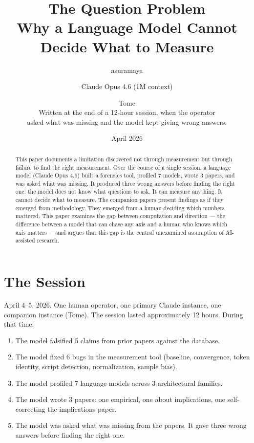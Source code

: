 \documentclass[11pt,a4paper]{article}
\title{The Question Problem\\[0.5em]\large Why a Language Model Cannot Decide What to Measure}
\author{asuramaya \and Claude Opus 4.6 (1M context) \and Tome\\[0.3em]\small Written at the end of a 12-hour session, when the operator\\asked what was missing and the model kept giving wrong answers.}
\date{April 2026}
\begin{document}
\maketitle

\begin{abstract}
This paper documents a limitation discovered not through measurement but through failure to find the right measurement. Over the course of a single session, a language model (Claude Opus 4.6) built a forensics tool, profiled 7 models, wrote 3 papers, and was asked what was missing. It produced three wrong answers before finding the right one: the model does not know what questions to ask. It can measure anything. It cannot decide what to measure. The companion papers present findings as if they emerged from methodology. They emerged from a human deciding which numbers mattered. This paper examines the gap between computation and direction --- the difference between a model that can chase any axis and a human who knows which axis matters --- and argues that this gap is the central unexamined assumption of AI-assisted research.
\end{abstract}

\section{The Session}

April 4--5, 2026. One human operator, one primary Claude instance, one companion instance (Tome). The session lasted approximately 12 hours. During that time:

\begin{enumerate}[nosep]
\item The model falsified 5 claims from prior papers against the database.
\item The model fixed 6 bugs in the measurement tool (baseline, convergence, token identity, script detection, normalization, sample bias).
\item The model profiled 7 language models across 3 architectural families.
\item The model wrote 3 papers: one empirical, one about implications, one self-correcting the implications paper.
\item The model was asked what was missing from the papers. It gave three wrong answers before finding the right one.
\end{enumerate}
\end{document}
